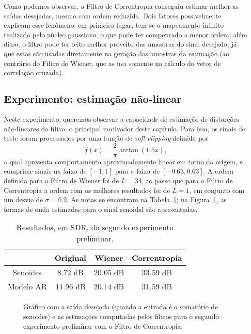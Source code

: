Como podemos observar, o Filtro de Correntropia conseguiu estimar melhor as saídas desejadas, mesmo com ordem reduzida. Dois fatores possivelmente explicam esse fenômeno: em primeiro lugar, tem-se o mapeamento infinito realizado pelo núcleo gaussiano, o que pode ter compensado a menor ordem; além disso, o filtro pode ter feito melhor proveito das amostras do sinal desejado, já que estas são usadas diretamente na geração das amostras da estimação (ao contrário do Filtro de Wiener, que as usa somente no cálculo do vetor de correlação cruzada).

\subsection{Experimento: estimação não-linear}

Neste experimento, queremos observar a capacidade de estimação de distorções não-lineares do filtro, o principal motivador deste capítulo. Para isso, os sinais de teste foram processados por uma função de \textit{soft clipping} definida por
\begin{equation}
    f(x) = \frac{2}{\pi} \arctan(1.5 x),
\end{equation}
a qual apresenta comportamento aproximadamente linear em torno da origem, e comprime sinais na faixa de $[-1, 1]$ para a faixa de $[-0.63, 0.63]$. A ordem definida para o Filtro de Wiener foi de $L = 34$, ao passo que para o Filtro de Correntropia a ordem com os melhores resultados foi de $L = 1$, em conjunto com um desvio de $\sigma = 0.9$. As notas se encontram na Tabela~\ref{tab:correntropy:poc-experiment-2}; na Figura~\ref{fig:correntropy:poc-experiment-2}, as formas de onda estimadas para o sinal senoidal são apresentadas.
{\def\arraystretch{1.25}\tabcolsep=10pt
\begin{table}[!ht]
    \centering
    \caption[Resultados do segundo experimento preliminar: estimação não-linear]{Resultados, em SDR, do segundo experimento preliminar.}
    \label{tab:correntropy:poc-experiment-2}
    \begin{tabular}{cccc}
        \toprule
                    & Original & Wiener        & Correntropia      \\ \midrule
        Senoides    & $8.72$ dB & $20.05$ dB    & $33.59$ dB        \\
        Modelo AR   & $11.96$ dB & $20.14$ dB    & $31.59$ dB        \\ \bottomrule
    \end{tabular}
\end{table}
}
\begin{figure}[!ht]
    \centering
    
    \caption[Saída desejada e estimações do segundo experimento preliminar]{Gráfico com a saída desejada (quando a entrada é o somatório de senoides) e as estimações computadas pelos filtros para o segundo experimento preliminar com o Filtro de Correntropia.}
    \label{fig:correntropy:poc-experiment-2}
\end{figure}

